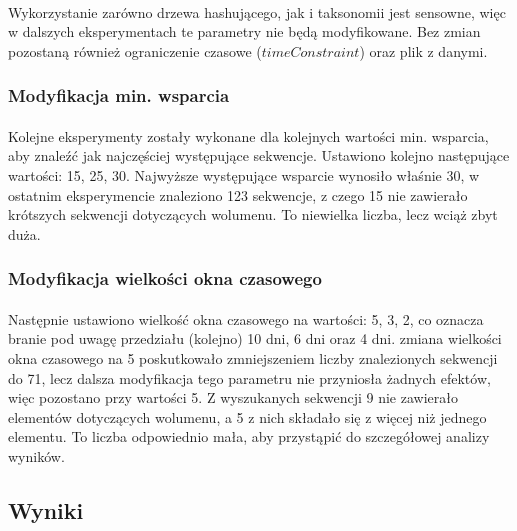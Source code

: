 \documentclass[11pt,a4paper]{article}
\begin{document}
\paragraph{}Wykorzystanie zarówno drzewa hashującego, jak i taksonomii jest sensowne, więc w dalszych eksperymentach te parametry nie będą modyfikowane. Bez zmian pozostaną również ograniczenie czasowe ($timeConstraint$) oraz plik z danymi.

\subsubsection{Modyfikacja min. wsparcia}
\paragraph{}Kolejne eksperymenty zostały wykonane dla kolejnych wartości min. wsparcia, aby znaleźć jak najczęściej występujące sekwencje. Ustawiono kolejno następujące wartości: 15, 25, 30. Najwyższe występujące wsparcie wynosiło właśnie 30, w ostatnim eksperymencie znaleziono 123 sekwencje, z czego 15 nie zawierało krótszych sekwencji dotyczących wolumenu. To niewielka liczba, lecz wciąż zbyt duża.
\subsubsection{Modyfikacja wielkości okna czasowego}
\paragraph{}Następnie ustawiono wielkość okna czasowego na wartości: 5, 3, 2, co oznacza branie pod uwagę przedziału (kolejno) 10 dni, 6 dni oraz 4 dni. zmiana wielkości okna czasowego na 5 poskutkowało zmniejszeniem liczby znalezionych sekwencji do 71, lecz dalsza modyfikacja tego parametru nie przyniosła żadnych efektów, więc pozostano przy wartości 5. Z wyszukanych sekwencji 9 nie zawierało elementów dotyczących wolumenu, a 5 z nich składało się z więcej niż jednego elementu. To liczba odpowiednio mała, aby przystąpić do szczegółowej analizy wyników.
\subsection{Wyniki}
\end{document}
